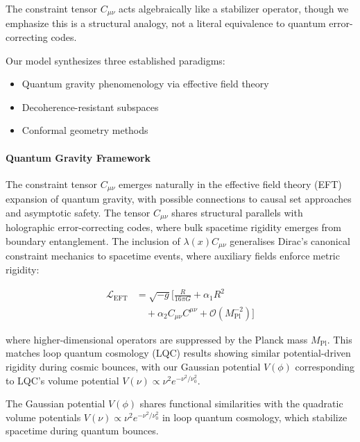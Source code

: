 \documentclass[twocolumn]{article}
\begin{document}
	The constraint tensor $C_{\mu\nu}$ acts algebraically like a stabilizer operator, though we emphasize this is a structural analogy, not a literal equivalence to quantum error-correcting codes.
	
	Our model synthesizes three established paradigms:  
	\begin{itemize}
		\item Quantum gravity phenomenology via effective field theory\cite{Donoghue1994}
		\item Decoherence-resistant subspaces\cite{zurek2003,Schlosshauer2007}
		\item Conformal geometry methods\cite{york1972}
	\end{itemize}
	
	\paragraph{Quantum Gravity Framework}
	The constraint tensor $C_{\mu\nu}$ emerges naturally in the effective field theory (EFT) expansion of quantum gravity\cite{Donoghue1994}, with possible connections to causal set approaches\cite{Bombelli1987} and asymptotic safety\cite{Reuter1998}. The tensor $C_{\mu\nu}$ shares structural parallels with holographic error-correcting codes\cite{almheiri2020}, where bulk spacetime rigidity emerges from boundary entanglement. The inclusion of $\lambda(x) C_{\mu\nu}$ generalises Dirac's canonical constraint mechanics\cite{dirac1950} to spacetime events, where auxiliary fields enforce metric rigidity:
	
	\begin{equation}
		\begin{split}
			\mathcal{L}_{\text{EFT}} &= \sqrt{-g} \biggl[ \frac{R}{16\pi G} + \alpha_1 R^2 \\  
			&\quad + \alpha_2 C_{\mu\nu}C^{\mu\nu} + \mathcal{O}\left(M_{\text{Pl}}^{-2}\right) \biggr]
		\end{split}
	\end{equation}
	
	where higher-dimensional operators are suppressed by the Planck mass $M_{\text{Pl}}$. This matches loop quantum cosmology (LQC) results\cite{Ashtekar2011} showing similar potential-driven rigidity during cosmic bounces, with our Gaussian potential $V(\phi)$ corresponding to LQC's volume potential $V(\nu) \propto \nu^2e^{-\nu^2/\nu_0^2}$.  
	
	The Gaussian potential $V(\phi)$ shares functional similarities with the quadratic volume potentials $V(\nu) \propto \nu^2 e^{-\nu^2/\nu_0^2}$ in loop quantum cosmology\cite{Ashtekar2011}, which stabilize spacetime during quantum bounces.  
	 
\end{document}
